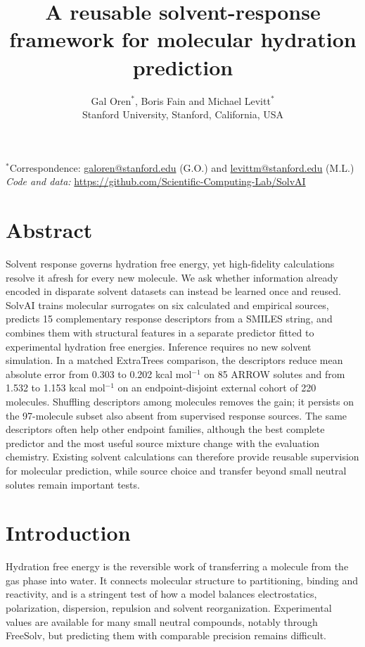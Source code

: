 \documentclass[12pt]{article}
\title{A reusable solvent-response framework for molecular hydration prediction}
\author{%
Gal Oren$^{*}$, Boris Fain and Michael Levitt$^{*}$\\[0.4em]
\small Stanford University, Stanford, California, USA
}
\date{}
\begin{document}
\maketitle
\begin{center}
\small $^{*}$Correspondence: \href{mailto:galoren@stanford.edu}{galoren@stanford.edu} (G.O.) and
\href{mailto:levittm@stanford.edu}{levittm@stanford.edu} (M.L.)\\[0.2em]
\textit{Code and data:} \url{https://github.com/Scientific-Computing-Lab/SolvAI}
\end{center}
\linenumbers

\section*{Abstract}

Solvent response governs hydration free energy, yet high-fidelity calculations
resolve it afresh for every new molecule. We ask whether information already
encoded in disparate solvent datasets can instead be learned once and reused.
SolvAI trains molecular surrogates on six calculated and empirical sources,
predicts 15 complementary response descriptors from a SMILES string, and combines
them with structural features in a separate predictor fitted to experimental
hydration free energies. Inference requires no new solvent simulation. In a
matched ExtraTrees comparison, the descriptors reduce mean absolute error from
0.303 to 0.202 kcal mol$^{-1}$ on 85 ARROW solutes and from 1.532 to 1.153
kcal mol$^{-1}$ on an endpoint-disjoint external cohort of 220 molecules.
Shuffling descriptors among molecules removes the gain; it persists on the
97-molecule subset also absent from supervised response sources. The same
descriptors often help other endpoint families, although the best complete
predictor and the most useful source mixture change with the evaluation
chemistry. Existing solvent calculations can therefore provide reusable
supervision for molecular prediction, while source choice and transfer beyond
small neutral solutes remain important tests.

\section*{Introduction}

Hydration free energy is the reversible work of transferring a molecule from the gas
phase into water. It connects molecular structure to partitioning, binding and
reactivity, and is a stringent test of how a model balances electrostatics,
polarization, dispersion, repulsion and solvent reorganization. Experimental values
are available for many small neutral compounds, notably through FreeSolv, but
predicting them with comparable precision remains difficult.\cite{freesolv2014,freesolv2017}
\end{document}

